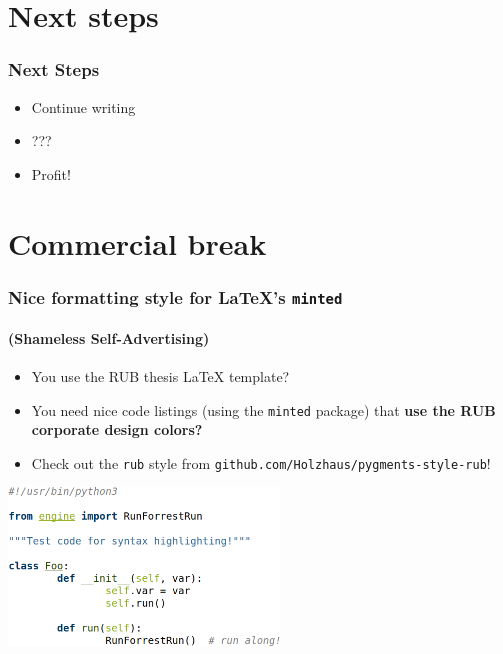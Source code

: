 \documentclass[
    alternativetitlepage=alternativ,
    cornerlogo=hgi_nds_logo2,
    sectionoverview,
]{rubpresentation}
\begin{document}
\section{Next steps}

\begin{frame}
    \frametitle{Next Steps}
    \begin{itemize}
        \item{} Continue writing
        \item{} ???
        \item{} Profit!
    \end{itemize}
\end{frame}

\section{Commercial break}

\begin{frame}
    \frametitle{Nice formatting style for \LaTeX's \texttt{minted}}
    \framesubtitle{(Shameless Self-Advertising)}
    \begin{itemize}
        \item{} You use the RUB thesis \LaTeX{} template?
        \item{} You need nice code listings (using the \texttt{minted} package) that \textbf{use the RUB corporate design colors?}
        \item{} Check out the \texttt{rub} style from \texttt{github.com/Holzhaus/pygments-style-rub}!
    \end{itemize}
    \begin{center}
        \includegraphics[height=4.2cm]{rubmintedstyle}
    \end{center}
\end{frame}

\end{document}
